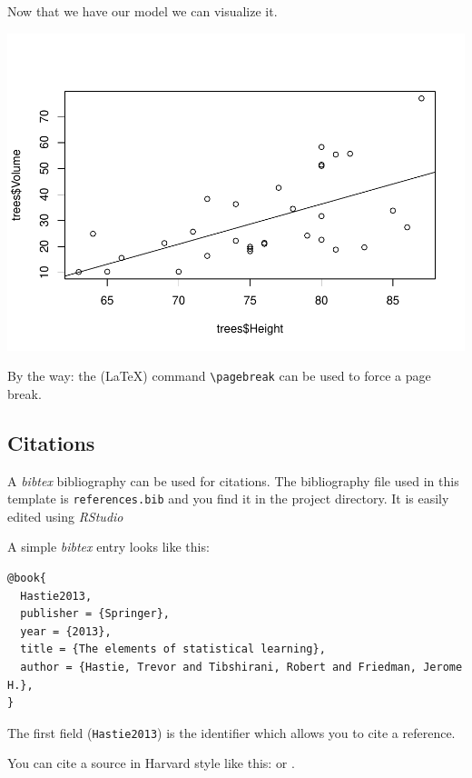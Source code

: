 \documentclass[11pt,a4paper]{article}
\let\origfigure\figure
\let\endorigfigure\endfigure
\renewenvironment{figure}[1][2] {
    \expandafter\origfigure\expandafter[H]
} {
    \endorigfigure
}
\begin{document}
Now that we have our model we can visualize it.

\begin{figure}
\centering
\includegraphics{paper_files/figure-latex/unnamed-chunk-4-1.pdf}
\caption{Dataset and regression}
\end{figure}

By the way: the (\LaTeX) command \texttt{\textbackslash{}pagebreak} can
be used to force a page break.

\pagebreak

\hypertarget{citations}{%
\subsection{Citations}\label{citations}}

A \emph{bibtex} bibliography can be used for citations. The bibliography
file used in this template is \texttt{references.bib} and you find it in
the project directory. It is easily edited using \emph{RStudio}

A simple \emph{bibtex} entry looks like this:

\begin{verbatim}
@book{
  Hastie2013,
  publisher = {Springer},
  year = {2013},
  title = {The elements of statistical learning},
  author = {Hastie, Trevor and Tibshirani, Robert and Friedman, Jerome H.},
}
\end{verbatim}

The first field (\texttt{Hastie2013}) is the identifier which allows you
to cite a reference.

You can cite a source in Harvard style like this: \autocite{Hastie2013}
or \textcite{Hastie2013}.
\end{document}
